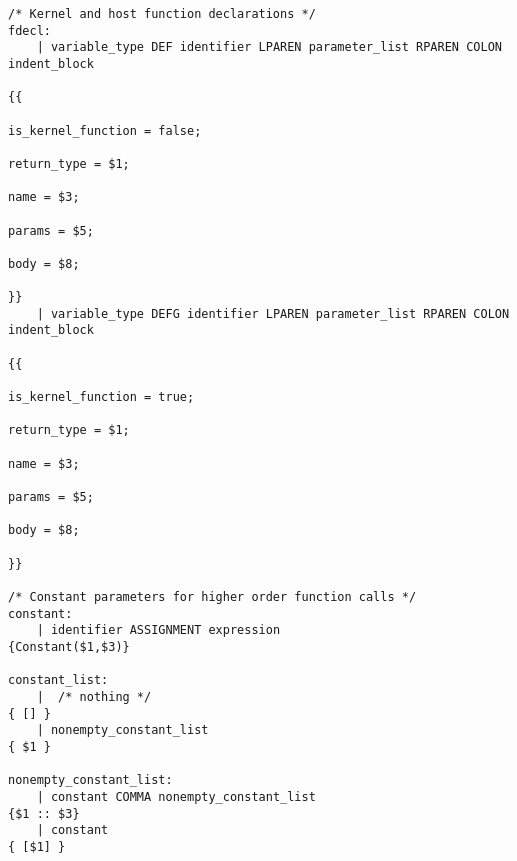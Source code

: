 \begin{verbatim}
/* Kernel and host function declarations */
fdecl:
    | variable_type DEF identifier LPAREN parameter_list RPAREN COLON indent_block
                                                                        {{ 
                                                                            is_kernel_function = false;
                                                                            return_type = $1;
                                                                            name = $3;
                                                                            params = $5;
                                                                            body = $8;
                                                                        }}
    | variable_type DEFG identifier LPAREN parameter_list RPAREN COLON indent_block
                                                                        {{
                                                                            is_kernel_function = true;
                                                                            return_type = $1;
                                                                            name = $3;
                                                                            params = $5;
                                                                            body = $8;
                                                                        }}

/* Constant parameters for higher order function calls */
constant:
    | identifier ASSIGNMENT expression                                  {Constant($1,$3)}
    
constant_list:
    |  /* nothing */                                                    { [] }
    | nonempty_constant_list                                            { $1 }

nonempty_constant_list:
    | constant COMMA nonempty_constant_list                             {$1 :: $3}
    | constant                                                          { [$1] }



\end{verbatim}
